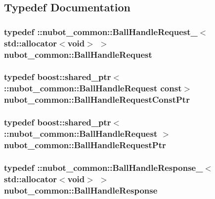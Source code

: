 \subsection{Typedef Documentation}
\hypertarget{namespacenubot__common_a47b9531f744aace81704d183c8f37107}{
\subsubsection[{Ball\-Handle\-Request}]{\setlength{\rightskip}{0pt plus 5cm}typedef \-::{\bf nubot\-\_\-common\-::\-Ball\-Handle\-Request\-\_\-}$<$std\-::allocator$<$void$>$ $>$ {\bf nubot\-\_\-common\-::\-Ball\-Handle\-Request}}}\label{namespacenubot__common_a47b9531f744aace81704d183c8f37107}
\hypertarget{namespacenubot__common_a13b0bac07f7e0ff274332e889c7bcc6b}{
\subsubsection[{Ball\-Handle\-Request\-Const\-Ptr}]{\setlength{\rightskip}{0pt plus 5cm}typedef boost\-::shared\-\_\-ptr$<$ \-::{\bf nubot\-\_\-common\-::\-Ball\-Handle\-Request} const$>$ {\bf nubot\-\_\-common\-::\-Ball\-Handle\-Request\-Const\-Ptr}}}\label{namespacenubot__common_a13b0bac07f7e0ff274332e889c7bcc6b}
\hypertarget{namespacenubot__common_ae7e699c9607faea27a823400688f92cb}{
\subsubsection[{Ball\-Handle\-Request\-Ptr}]{\setlength{\rightskip}{0pt plus 5cm}typedef boost\-::shared\-\_\-ptr$<$ \-::{\bf nubot\-\_\-common\-::\-Ball\-Handle\-Request} $>$ {\bf nubot\-\_\-common\-::\-Ball\-Handle\-Request\-Ptr}}}\label{namespacenubot__common_ae7e699c9607faea27a823400688f92cb}
\hypertarget{namespacenubot__common_a794ba6eb699c7139e7256886a99845bb}{
\subsubsection[{Ball\-Handle\-Response}]{\setlength{\rightskip}{0pt plus 5cm}typedef \-::{\bf nubot\-\_\-common\-::\-Ball\-Handle\-Response\-\_\-}$<$std\-::allocator$<$void$>$ $>$ {\bf nubot\-\_\-common\-::\-Ball\-Handle\-Response}}}\label{namespacenubot__common_a794ba6eb699c7139e7256886a99845bb}
